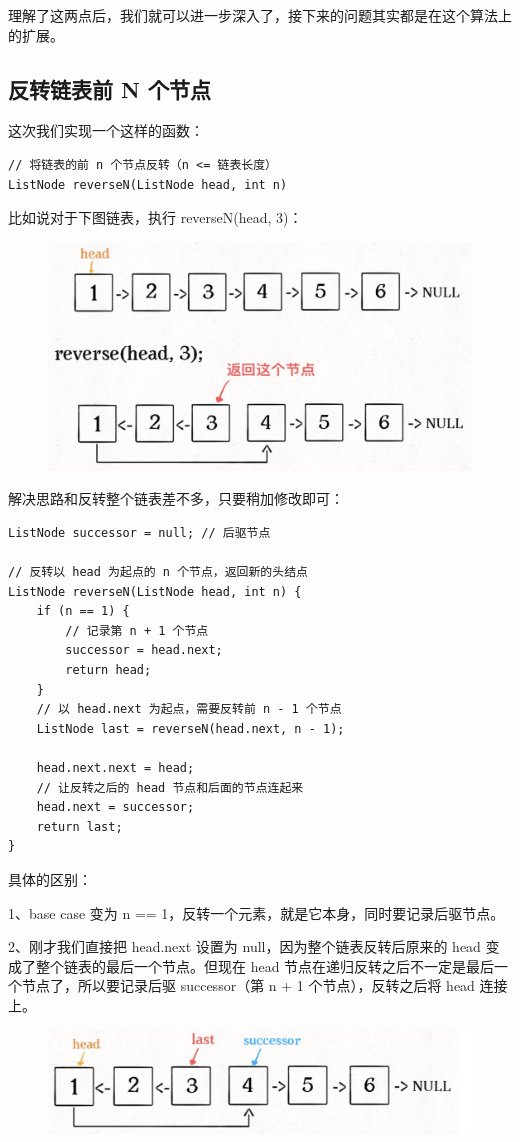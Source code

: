 \documentclass[12pt]{article}
\begin{document}
理解了这两点后，我们就可以进一步深入了，接下来的问题其实都是在这个算法上的扩展。

\subsection{反转链表前 N 个节点}
这次我们实现一个这样的函数：
\begin{lstlisting}
// 将链表的前 n 个节点反转（n <= 链表长度）
ListNode reverseN(ListNode head, int n)
\end{lstlisting}

比如说对于下图链表，执行 reverseN(head, 3)：
\begin{figure}[H]
    \centering
    \includegraphics[width=.5\textwidth]{fig/Reverse_Single_List_7.png}
\end{figure}

解决思路和反转整个链表差不多，只要稍加修改即可：
\begin{lstlisting}
ListNode successor = null; // 后驱节点

// 反转以 head 为起点的 n 个节点，返回新的头结点
ListNode reverseN(ListNode head, int n) {
    if (n == 1) { 
        // 记录第 n + 1 个节点
        successor = head.next;
        return head;
    }
    // 以 head.next 为起点，需要反转前 n - 1 个节点
    ListNode last = reverseN(head.next, n - 1);

    head.next.next = head;
    // 让反转之后的 head 节点和后面的节点连起来
    head.next = successor;
    return last;
}    
\end{lstlisting}

具体的区别：

1、base case 变为 n == 1，反转一个元素，就是它本身，同时要记录后驱节点。

2、刚才我们直接把 head.next 设置为 null，因为整个链表反转后原来的 head 变成了整个链表的最后一个节点。但现在 head 节点在递归反转之后不一定是最后一个节点了，所以要记录后驱 successor（第 n + 1 个节点），反转之后将 head 连接上。
\begin{figure}[H]
    \centering
    \includegraphics[width=.5\textwidth]{fig/Reverse_Single_List_8.png}
\end{figure}
\end{document}

